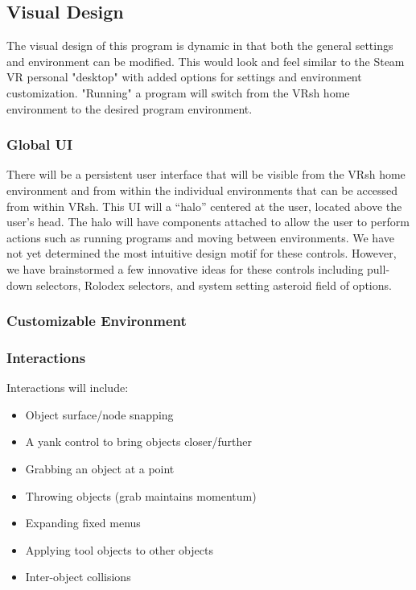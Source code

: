 \documentclass[titlepage,12pt]{article}
\newcommand\name{VRsh\xspace}
\begin{document}
\subsection{Visual Design}
The visual design of this program is dynamic in that both the general 
settings and environment can be modified. This would look and feel 
similar to the Steam VR personal "desktop" with added options for settings
and environment customization. "Running" a program will switch from the \name 
home environment to the desired program environment.

\subsubsection{Global UI}\label{sec:ui}
There will be a persistent user interface that will be visible from the \name
home environment and from within the individual environments that can be
accessed from within \name. This UI will a ``halo'' centered at the user,
located above the user's head. The halo will have components attached to allow
the user to perform actions such as running programs and moving between
environments. We have not yet determined the most intuitive design motif for
these controls. However, we have brainstormed a few innovative ideas for these
controls including pull-down selectors, Rolodex selectors, and system setting
asteroid field of options.

\subsubsection{Customizable Environment}\label{sec:env}

\subsubsection{Interactions}

Interactions will include:
\begin{itemize}
    \item Object surface/node snapping
    \item A yank control to bring objects closer/further
    \item Grabbing an object at a point
    \item Throwing objects (grab maintains momentum)
    \item Expanding fixed menus
    \item Applying tool objects to other objects
    \item Inter-object collisions
\end{itemize}
\end{document}
